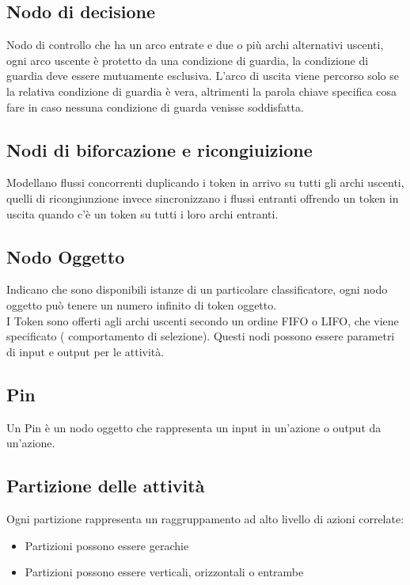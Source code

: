 \subsection*{Nodo di decisione}
Nodo di controllo che ha un arco entrate e due o più archi alternativi uscenti, ogni
arco uscente è protetto da una condizione di guardia, la condizione di guardia deve
essere mutuamente esclusiva. L'arco di uscita viene percorso solo se la relativa condizione di guardia è
vera, altrimenti la parola chiave specifica cosa fare in caso nessuna condizione di guarda venisse soddisfatta.
\subsection*{Nodi di biforcazione e ricongiuizione}
Modellano flussi concorrenti duplicando i token in arrivo su tutti gli archi uscenti, quelli di
ricongiunzione invece sincronizzano i flussi entranti offrendo un token in uscita quando c'è un token su tutti
i loro archi entranti.
\subsection*{Nodo Oggetto}
Indicano che sono disponibili istanze di un particolare classificatore, ogni nodo oggetto può tenere un numero
infinito di token oggetto.
\\ I Token sono offerti agli archi uscenti secondo un ordine FIFO o LIFO, che viene specificato (
comportamento di selezione). Questi nodi possono essere parametri di input e output per le attività.
\subsection*{Pin}
Un Pin è un nodo oggetto che rappresenta un input in un'azione o output da un'azione.
\subsection*{Partizione delle attività}
Ogni partizione rappresenta un raggruppamento ad alto livello di azioni correlate:
\begin{itemize}
    \item Partizioni possono essere gerachie
    \item Partizioni possono essere verticali, orizzontali o entrambe
\end{itemize}
